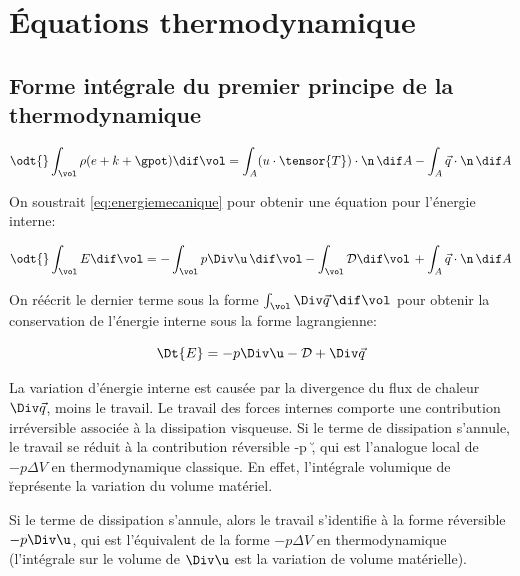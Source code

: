 
\section{Équations thermodynamique}
\subsection{Forme intégrale du premier principe de la thermodynamique}

\cite[p. 108]{kundu04aa}

\begin{equation}
\odt{}\int_\vol \rho (e + k + \gpot) \dif \vol = 
\int_A (u\cdot\tensor{T})\cdot \n \, \dif A -
\int_A \vec{q} \cdot \n \, \dif A
  \label{eq:energy}
\end{equation}

On soustrait \eqref{eq:energiemecanique} pour obtenir une équation pour l'énergie interne: 

\begin{displaymath}
\odt{}\int_\vol E \dif \vol = 
- \int_\vol p \Div \u\, \dif \vol 
-  \int_\vol \mathcal{D} \dif \vol\,
+ \int_A \vec{q} \cdot \n \, \dif A
  \label{eq:energy_euler}
\end{displaymath}

On réécrit le dernier terme sous la forme $\int_\vol \Div \vec{q} \,\dif\vol$ pour obtenir la conservation de l'énergie interne sous la forme lagrangienne: 

\begin{equation}
	\Dt{E} = - p \Div \u - \mathcal{D} + \Div\vec{q}
	\label{eq:energy_lagrange}
\end{equation}

La variation d'énergie interne est causée par la divergence du flux de chaleur $\Div\vec{q}$, moins le travail. 
Le travail des forces internes comporte une contribution irréversible associée à la dissipation visqueuse.
Si le terme de dissipation s’annule, le travail se réduit à la contribution réversible -p \Div \u, qui est l’analogue local de $-p\Delta V$ en thermodynamique classique. En effet, l’intégrale volumique de \Div \u représente la variation du volume matériel.

Si le terme de dissipation s'annule, alors le travail s'identifie à la forme réversible $-p \Div \u$, qui est l'équivalent de la forme $-p \Delta V$ en thermodynamique (l'intégrale sur le volume de $\Div\u$ est la variation de volume matérielle). 

